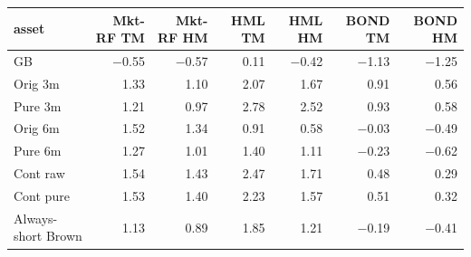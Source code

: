 \begin{tabular}{lrrrrrr}
\toprule
asset & Mkt-RF TM & Mkt-RF HM & HML TM & HML HM & BOND TM & BOND HM \\
\midrule
GB & $-$0.55 & $-$0.57 & 0.11 & $-$0.42 & $-$1.13 & $-$1.25 \\
Orig 3m & 1.33 & 1.10 & 2.07 & 1.67 & 0.91 & 0.56 \\
Pure 3m & 1.21 & 0.97 & 2.78 & 2.52 & 0.93 & 0.58 \\
Orig 6m & 1.52 & 1.34 & 0.91 & 0.58 & $-$0.03 & $-$0.49 \\
Pure 6m & 1.27 & 1.01 & 1.40 & 1.11 & $-$0.23 & $-$0.62 \\
Cont raw & 1.54 & 1.43 & 2.47 & 1.71 & 0.48 & 0.29 \\
Cont pure & 1.53 & 1.40 & 2.23 & 1.57 & 0.51 & 0.32 \\
Always-short Brown & 1.13 & 0.89 & 1.85 & 1.21 & $-$0.19 & $-$0.41 \\
\bottomrule
\end{tabular}
